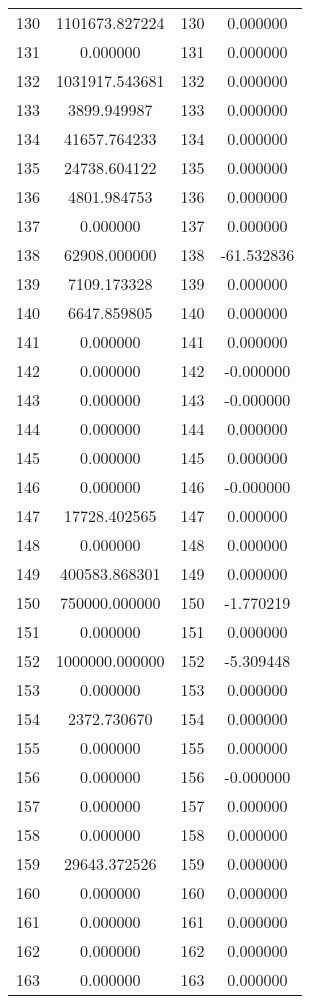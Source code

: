 \documentclass[12pt]{article}
\begin{document}
\begin{longtable}{@{}cccc@{}}
130 & 1101673.827224 & 130 & 0.000000 \\
131 & 0.000000 & 131 & 0.000000 \\
132 & 1031917.543681 & 132 & 0.000000 \\
133 & 3899.949987 & 133 & 0.000000 \\
134 & 41657.764233 & 134 & 0.000000 \\
135 & 24738.604122 & 135 & 0.000000 \\
136 & 4801.984753 & 136 & 0.000000 \\
137 & 0.000000 & 137 & 0.000000 \\
138 & 62908.000000 & 138 & -61.532836 \\
139 & 7109.173328 & 139 & 0.000000 \\
140 & 6647.859805 & 140 & 0.000000 \\
141 & 0.000000 & 141 & 0.000000 \\
142 & 0.000000 & 142 & -0.000000 \\
143 & 0.000000 & 143 & -0.000000 \\
144 & 0.000000 & 144 & 0.000000 \\
145 & 0.000000 & 145 & 0.000000 \\
146 & 0.000000 & 146 & -0.000000 \\
147 & 17728.402565 & 147 & 0.000000 \\
148 & 0.000000 & 148 & 0.000000 \\
149 & 400583.868301 & 149 & 0.000000 \\
150 & 750000.000000 & 150 & -1.770219 \\
151 & 0.000000 & 151 & 0.000000 \\
152 & 1000000.000000 & 152 & -5.309448 \\
153 & 0.000000 & 153 & 0.000000 \\
154 & 2372.730670 & 154 & 0.000000 \\
155 & 0.000000 & 155 & 0.000000 \\
156 & 0.000000 & 156 & -0.000000 \\
157 & 0.000000 & 157 & 0.000000 \\
158 & 0.000000 & 158 & 0.000000 \\
159 & 29643.372526 & 159 & 0.000000 \\
160 & 0.000000 & 160 & 0.000000 \\
161 & 0.000000 & 161 & 0.000000 \\
162 & 0.000000 & 162 & 0.000000 \\
163 & 0.000000 & 163 & 0.000000 \\

\end{longtable}
\end{document}
